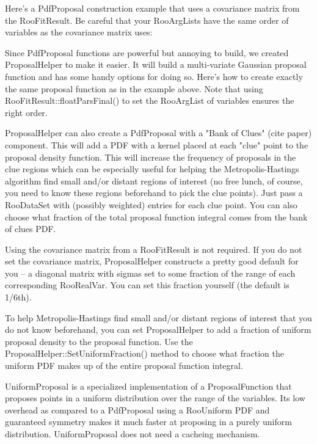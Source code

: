 \documentclass[11pt]{article}
\begin{document}
	Here's a PdfProposal construction example that uses a covariance matrix from the RooFitResult.  Be careful that your RooArgLists have the same order of variables as the covariance matrix uses:
	
	
	
	Since PdfProposal functions are powerful but annoying to build, we created ProposalHelper to make it easier.  It will build a multi-variate Gaussian proposal function and has some handy options for doing so.  Here's how to create exactly the same proposal function as in the example above.  Note that using RooFitResult::floatParsFinal() to set the RooArgList of variables ensures the right order.
	
	
	
	ProposalHelper can also create a PdfProposal with a "Bank of Clues" (cite paper) component.  This will add a PDF with a kernel placed at each "clue" point to the proposal density function.  This will increase the frequency of proposals in the clue regions which can be especially useful for helping the Metropolis-Hastings algorithm find small and/or distant regions of interest (no free lunch, of course, you need to know these regions beforehand to pick the clue points).  Just pass a RooDataSet with (possibly weighted) entries for each clue point.  You can also choose what fraction of the total proposal function integral comes from the bank of clues PDF.
	
	
	
	Using the covariance matrix from a RooFitResult is not required.  If you do not set the covariance matrix, ProposalHelper constructs a pretty good default for you -- a diagonal matrix with sigmas set to some fraction of the range of each corresponding RooRealVar.  You can set this fraction yourself (the default is 1/6th).
	
	To help Metropolis-Hastings find small and/or distant regions of interest that you do not know beforehand, you can set ProposalHelper to add a fraction of uniform proposal density to the proposal function.  Use the ProposalHelper::SetUniformFraction() method to choose what fraction the uniform PDF makes up of the entire proposal function integral.

	UniformProposal is a specialized implementation of a ProposalFunction that proposes points in a uniform distribution over the range of the variables.  Its low overhead as compared to a PdfProposal using a RooUniform PDF and guaranteed symmetry makes it much faster at proposing in a purely uniform distribution.  UniformProposal does not need a cacheing mechanism.
	
\end{document}

